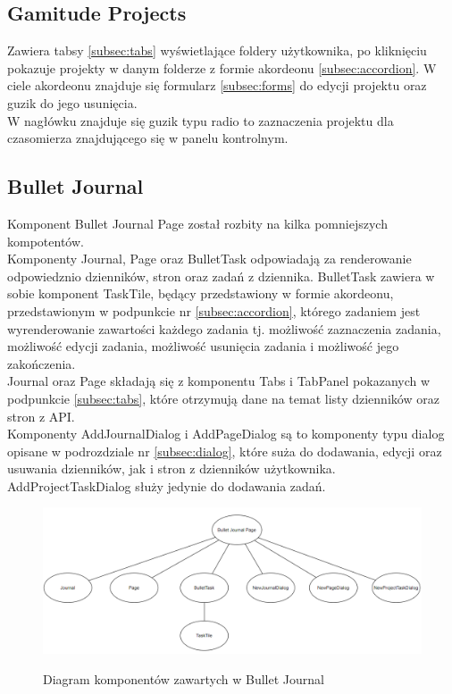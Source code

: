 \documentclass[a4paper,11pt]{report}
\begin{document}
\subsection{Gamitude Projects}
Zawiera tabsy \ref{subsec:tabs} wyświetlające foldery użytkownika, po kliknięciu pokazuje projekty w danym folderze z formie akordeonu \ref{subsec:accordion}.
W ciele akordeonu znajduje się formularz \ref{subsec:forms} do edycji projektu oraz guzik do jego usunięcia.\\
W nagłówku znajduje się guzik typu radio to zaznaczenia projektu dla czasomierza znajdującego się w panelu kontrolnym.

\subsection{Bullet Journal}
Komponent Bullet Journal Page został rozbity na kilka pomniejszych kompotentów.\\
 Komponenty Journal, Page oraz BulletTask odpowiadają za renderowanie odpowiedznio dzienników, stron oraz zadań z dziennika.
 BulletTask zawiera w sobie komponent TaskTile, będący przedstawiony w formie akordeonu, przedstawionym w podpunkcie nr \ref{subsec:accordion},
 którego zadaniem jest wyrenderowanie zawartości każdego zadania tj. możliwość zaznaczenia zadania, możliwość edycji zadania, możliwość usunięcia zadania i możliwość jego zakończenia.\\
 Journal oraz Page składają się z komponentu Tabs i TabPanel pokazanych w podpunkcie \ref{subsec:tabs}, które otrzymują dane na temat listy dzienników oraz stron z API.\\
 Komponenty AddJournalDialog i AddPageDialog są to komponenty typu dialog opisane w podrozdziale nr \ref{subsec:dialog},
 które suża do dodawania, edycji oraz usuwania dzienników, jak i stron z dzienników użytkownika.
 AddProjectTaskDialog służy jedynie do dodawania zadań.\\
\begin{figure}[H]
	\centering
	\includegraphics[scale=0.4]{implementacja/frontend/bullet_journal_diagram}\\
	\caption{Diagram komponentów zawartych w Bullet Journal}
	\label{fig:bullet_diagram}
\end{figure}
\end{document}
